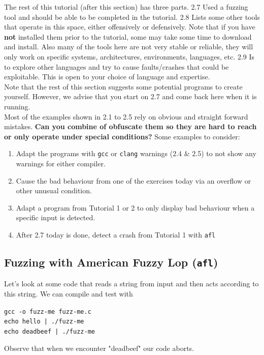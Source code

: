 \documentclass{article}
\begin{document}
\noindent The rest of this tutorial (after this section) has three parts. 2.7 Used a
fuzzing tool and should be able to be completed in the tutorial. 2.8 Lists
some other tools that operate in this space, either offensively or defensively.
Note that if you have \textbf{not} installed them prior to the tutorial, some may
take some time to download and install. Also many of the tools here are not
very stable or reliable, they will only work on specific systems, architectures,
environments, languages, etc. 2.9 Is to explore other languages and try to
cause faults/crashes that could be exploitable. This is open to your choice
of language and expertise.\\

\noindent Note that the rest of this section suggests some potential programs to
create yourself. However, we advise that you start on 2.7 and come back
here when it is running.\\

\noindent Most of the examples shown in 2.1 to 2.5 rely on obvious and straight
forward mistakes. \textbf{Can you combine of obfuscate them so they are hard to
reach or only operate under special conditions?} Some examples to consider:
\begin{enumerate}
    \item Adapt the programs with \lstinline{gcc} or \lstinline{clang} warnings (2.4 & 2.5) to not show any warnings for either compiler.
    \item Cause the bad behaviour from one of the exercises today via an overflow or other unusual condition.
    \item Adapt a program from Tutorial 1 or 2 to only display bad behaviour when a specific input is detected.
    \item After 2.7 today is done, detect a crash from Tutorial 1 with \lstinline{afl}
\end{enumerate}
\newpage
\subsection{Fuzzing with American Fuzzy Lop (\lstinline{afl})}
Let's look at some code that reads a string from input and then acts according
to this string. We can compile and test with
\begin{center}
    \lstinline{gcc -o fuzz-me fuzz-me.c}\\
    \lstinline{echo hello | ./fuzz-me}\\
    \lstinline{echo deadbeef | ./fuzz-me}
\end{center}
\noindent Observe that when we encounter "deadbeef" our code aborts.\\
\end{document}
